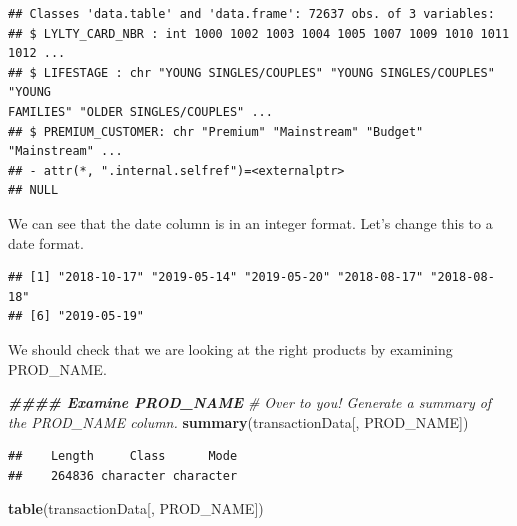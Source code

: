 \documentclass[
]{article}
\newenvironment{Shaded}{\begin{snugshade}}{\end{snugshade}}
\newcommand{\AttributeTok}[1]{\textcolor[rgb]{0.13,0.29,0.53}{#1}}
\newcommand{\CommentTok}[1]{\textcolor[rgb]{0.56,0.35,0.01}{\textit{#1}}}
\newcommand{\DocumentationTok}[1]{\textcolor[rgb]{0.56,0.35,0.01}{\textbf{\textit{#1}}}}
\newcommand{\FunctionTok}[1]{\textcolor[rgb]{0.13,0.29,0.53}{\textbf{#1}}}
\newcommand{\NormalTok}[1]{#1}
\newcommand{\OtherTok}[1]{\textcolor[rgb]{0.56,0.35,0.01}{#1}}
\newcommand{\SpecialCharTok}[1]{\textcolor[rgb]{0.81,0.36,0.00}{\textbf{#1}}}
\newcommand{\StringTok}[1]{\textcolor[rgb]{0.31,0.60,0.02}{#1}}
\begin{document}
\begin{verbatim}
## Classes 'data.table' and 'data.frame': 72637 obs. of 3 variables:
## $ LYLTY_CARD_NBR : int 1000 1002 1003 1004 1005 1007 1009 1010 1011 1012 ...
## $ LIFESTAGE : chr "YOUNG SINGLES/COUPLES" "YOUNG SINGLES/COUPLES" "YOUNG
FAMILIES" "OLDER SINGLES/COUPLES" ...
## $ PREMIUM_CUSTOMER: chr "Premium" "Mainstream" "Budget" "Mainstream" ...
## - attr(*, ".internal.selfref")=<externalptr>
## NULL
\end{verbatim}

We can see that the date column is in an integer format. Let's change
this to a date format.

\begin{Shaded}
\end{Shaded}

\begin{verbatim}
## [1] "2018-10-17" "2019-05-14" "2019-05-20" "2018-08-17" "2018-08-18"
## [6] "2019-05-19"
\end{verbatim}

We should check that we are looking at the right products by examining
PROD\_NAME.

\begin{Shaded}
\begin{Highlighting}[]
\DocumentationTok{\#\#\#\# Examine PROD\_NAME}
\CommentTok{\# Over to you! Generate a summary of the PROD\_NAME column.}
\FunctionTok{summary}\NormalTok{(transactionData[, PROD\_NAME])}
\end{Highlighting}
\end{Shaded}

\begin{verbatim}
##    Length     Class      Mode 
##    264836 character character
\end{verbatim}

\begin{Shaded}
\begin{Highlighting}[]
\FunctionTok{table}\NormalTok{(transactionData[, PROD\_NAME])}
\end{Highlighting}
\end{Shaded}
\end{document}
